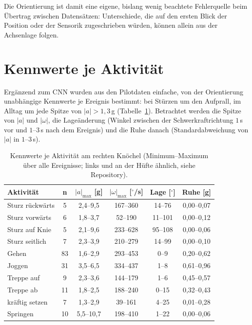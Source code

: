 \documentclass[11pt,a4paper,oneside]{report}
\begin{document}
Die Orientierung ist damit eine eigene, bislang wenig beachtete
Fehlerquelle beim Übertrag zwischen Datensätzen: Unterschiede, die auf
den ersten Blick der Position oder der Sensorik zugeschrieben würden,
können allein aus der Achsenlage folgen.

\section{Kennwerte je Aktivität}
\label{sec:fuss_kennwerte}

Ergänzend zum CNN wurden aus den Pilotdaten einfache, von der
Orientierung unabhängige Kennwerte je Ereignis bestimmt: bei Stürzen
um den Aufprall, im Alltag um jede Spitze von $|a| > 1{,}3$\,g
(Tabelle~\ref{tab:fuss_kennwerte}). Betrachtet werden die Spitze von
$|a|$ und $|\omega|$, die Lageänderung (Winkel zwischen der
Schwerkraftrichtung $1$\,s vor und $1$--$3$\,s nach dem Ereignis) und
die Ruhe danach (Standardabweichung von $|a|$ in $1$--$3$\,s).

\begin{table}[H]
\centering
\caption{Kennwerte je Aktivität am rechten Knöchel (Minimum--Maximum
         über alle Ereignisse; links und an der Hüfte ähnlich, siehe
         Repository).}
\label{tab:fuss_kennwerte}
\small
\begin{tabularx}{\textwidth}{X c c c c c}
\toprule
\textbf{Aktivität} & \textbf{n} & \textbf{$|a|_{\max}$ [g]} &
\textbf{$|\omega|_{\max}$ [$^{\circ}$/s]} & \textbf{Lage [$^{\circ}$]} &
\textbf{Ruhe [g]} \\
\midrule
Sturz rückwärts & 5  & 2,4--9,5  & 167--360 & 14--76  & 0,00--0,07 \\
Sturz vorwärts  & 6  & 1,8--3,7  & 52--190  & 11--101 & 0,00--0,12 \\
Sturz auf Knie  & 5  & 2,1--9,6  & 233--628 & 95--108 & 0,00--0,06 \\
Sturz seitlich  & 7  & 2,3--3,9  & 210--279 & 14--99  & 0,00--0,10 \\
\midrule
Gehen           & 83 & 1,6--2,9  & 293--453 & 0--9    & 0,20--0,62 \\
Joggen          & 31 & 3,5--6,5  & 334--437 & 1--8    & 0,61--0,96 \\
Treppe auf      & 9  & 2,3--3,6  & 144--179 & 1--6    & 0,45--0,57 \\
Treppe ab       & 11 & 1,8--2,5  & 188--240 & 0--15   & 0,32--0,43 \\
kräftig setzen  & 7  & 1,3--2,9  & 39--161  & 4--25   & 0,01--0,28 \\
Springen        & 10 & 5,5--10,7 & 198--410 & 1--22   & 0,00--0,06 \\
\bottomrule
\end{tabularx}
\end{table}
\end{document}
